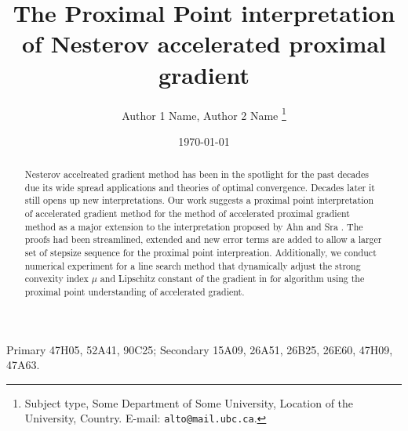\documentclass[12pt]{article}
\begin{document}
\title{{\selectfont The Proximal Point interpretation of Nesterov accelerated proximal gradient}}

\author{
    Author 1 Name, Author 2 Name
    \thanks{
        Subject type, Some Department of Some University, Location of the University,
        Country. E-mail: \texttt{alto@mail.ubc.ca}.
    }
}

\date{\today}

\maketitle


\begin{abstract} 
    \noindent
    Nesterov accelreated gradient method has been in the spotlight for the past decades due its wide spread applications and theories of optimal convergence. 
    Decades later it still opens up new interpretations. 
    Our work suggests a proximal point interpretation of accelerated gradient method for the method of accelerated proximal gradient method as a major extension to the interpretation proposed by Ahn and Sra \cite{ahn_understanding_2022}. 
    The proofs had been streamlined, extended and new error terms are added to allow a larger set of stepsize sequence for the proximal point interpreation. 
    Additionally, we conduct numerical experiment for a line search method that dynamically adjust the strong convexity index $\mu$ and Lipschitz constant of the gradient in for algorithm  using the proximal point understanding of accelerated gradient. 
    
\end{abstract}

Primary 47H05, 52A41, 90C25; Secondary 15A09, 26A51, 26B25, 26E60, 47H09, 47A63.
\end{document}
